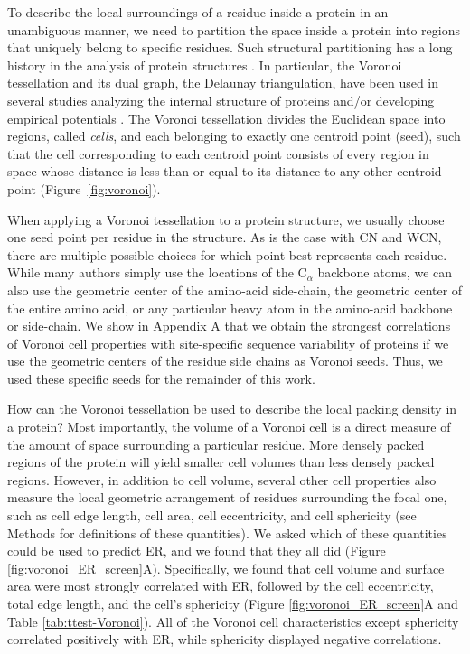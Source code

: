 \documentclass[12pt]{article}
\begin{document}
To describe the local surroundings of a residue inside a protein in an unambiguous manner, we need to partition the space inside a protein into regions that uniquely belong to specific residues. Such structural partitioning has a long history in the analysis of protein structures \cite{richards_interpretation_1974, gerstein_volume_1994}. In particular, the Voronoi tessellation and its dual graph, the Delaunay triangulation, have been used in several studies analyzing the internal structure of proteins and/or developing empirical potentials \cite{zomorodian_geometric_2006, zhou_alpha_2014, xia_identifying_2014}. 
The Voronoi tessellation divides the Euclidean space into regions, called {\it cells}, and each belonging to exactly one centroid point (seed), such that the cell corresponding to each centroid point consists of every region in space whose distance is less than or equal to its distance to any other centroid point (Figure~\ref{fig:voronoi}).

When applying a Voronoi tessellation to a protein structure, we usually choose one seed point per residue in the structure. As is the case with CN and WCN, there are multiple possible choices for which point best represents each residue. While many authors simply use the locations of the C$_\alpha$ backbone atoms, we can also use the geometric center of the amino-acid side-chain, the geometric center of the entire amino acid, or any particular heavy atom in the amino-acid backbone or side-chain. We show in Appendix A that we obtain the strongest correlations of Voronoi cell properties with site-specific sequence variability of proteins if we use the geometric centers of the residue side chains as Voronoi seeds. Thus, we used these specific seeds for the remainder of this work.

How can the Voronoi tessellation be used to describe the local packing density in a protein? Most importantly, the volume of a Voronoi cell is a direct measure of the amount of space surrounding a particular residue. More densely packed regions of the protein will yield smaller cell volumes than less densely packed regions. However, in addition to cell volume, several other cell properties also measure the local geometric arrangement of residues surrounding the focal one, such as cell edge length, cell area, cell eccentricity, and cell sphericity (see Methods for definitions of these quantities). We asked which of these quantities could be used to predict ER, and we found that they all did (Figure \ref{fig:voronoi_ER_screen}A). Specifically, we found that cell volume and surface area were most strongly correlated with ER, followed by the cell eccentricity, total edge length, and the cell's sphericity (Figure \ref{fig:voronoi_ER_screen}A and Table \ref{tab:ttest-Voronoi}). All of the Voronoi cell characteristics except sphericity correlated positively with ER, while sphericity displayed negative correlations.
\end{document}

